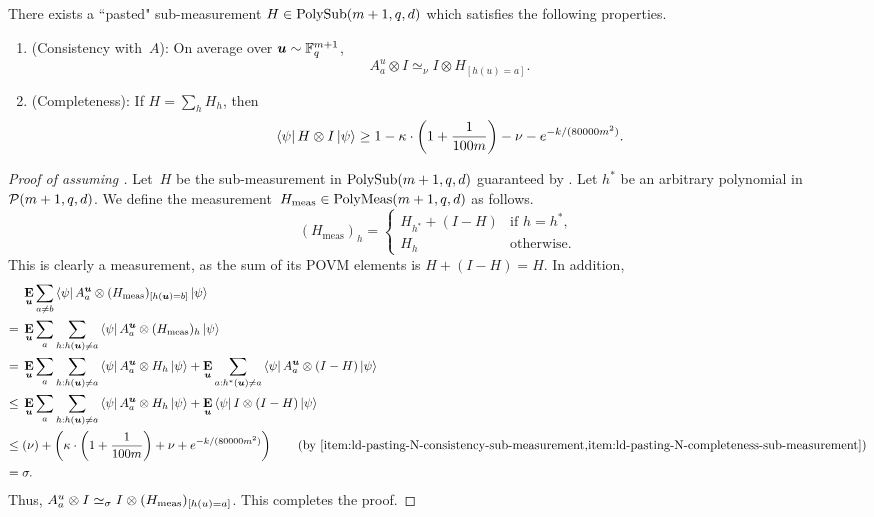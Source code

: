 \begin{lemma}\label{lem:ld-pasting-sub-measurement}
There exists a ``pasted" sub-measurement $H \in \mathrm{PolySub}(m+1, q, d)$ which satisfies the following properties.
  \begin{enumerate}
  \item (Consistency with~$A$): \label{item:ld-pasting-N-consistency-sub-measurement} On average over $\boldsymbol{u} \sim \mathbb F_q^{m+1}$,
	  \begin{equation*}
	  A^{u}_a \otimes I \simeq_{\nu} I \otimes H_{[h(u)=a]}.
	  \end{equation*}
  \item (Completeness): \label{item:ld-pasting-N-completeness-sub-measurement} If $H =  \sum_h H_h$, then
  	\begin{equation*}
	\bra{\psi} H \otimes I \ket{\psi} \geq 1 - \kappa \cdot \left(1 + \frac{1}{100m}\right)
    - \nu - e^{- k/(80000m^2)}.
	\end{equation*}
  \end{enumerate}
\end{lemma}
\begin{proof}[Proof of  assuming ]
Let~$H$ be the sub-measurement in $\mathrm{PolySub}(m+1, q, d)$ guaranteed by .
Let $h^*$ be an arbitrary polynomial in $\mathcal{P}(m+1, q, d)$.
We define the measurement~$H_{\mathrm{meas}} \in \mathrm{PolyMeas}(m+1, q, d)$ as follows.
\begin{equation*}
(H_{\mathrm{meas}})_h
= \left\{\begin{array}{cl}
		H_{h^*} + (I- H) & \text{if $h = h^*$,}\\
		H_h & \text{otherwise.}
		\end{array}
		\right.
\end{equation*}
This is clearly a measurement, as the sum of its POVM elements is $H + (I -H) = H$.
In addition,
\begin{align*}
&\E_{\bu} \sum_{a \neq b} \bra{\psi} A^{\bu}_a \ot (H_{\mathrm{meas}})_{[h(\bu)=b]} \ket{\psi}\\
 ={}& \E_{\bu} \sum_{a} \sum_{h:h(\bu) \neq a} \bra{\psi} A^{\bu}_a \ot (H_{\mathrm{meas}})_{h} \ket{\psi}\\
 ={}& \E_{\bu} \sum_{a} \sum_{h:h(\bu) \neq a} \bra{\psi} A^{\bu}_a \ot H_{h} \ket{\psi}
 	+\E_{\bu} \sum_{a:h^*(\bu) \neq a}\bra{\psi} A^{\bu}_a \ot (I-H) \ket{\psi}\\
 \leq{}& \E_{\bu} \sum_{a} \sum_{h:h(\bu) \neq a} \bra{\psi} A^{\bu}_a \ot H_{h} \ket{\psi}
 	+\E_{\bu} \bra{\psi} I \ot (I-H) \ket{\psi}\\
\leq{}& (\nu) +  \left(\kappa \cdot \left(1 + \frac{1}{100m}\right)
    				+ \nu + e^{- k/(80000m^2)}\right)
					\tag{by \Cref{item:ld-pasting-N-consistency-sub-measurement,item:ld-pasting-N-completeness-sub-measurement}}\\
={}& \sigma.
\end{align*}
Thus, $A^u_a \otimes I \simeq_{\sigma} I \otimes (H_{\mathrm{meas}})_{[h(u)=a]}$. This completes the proof.
\end{proof}

